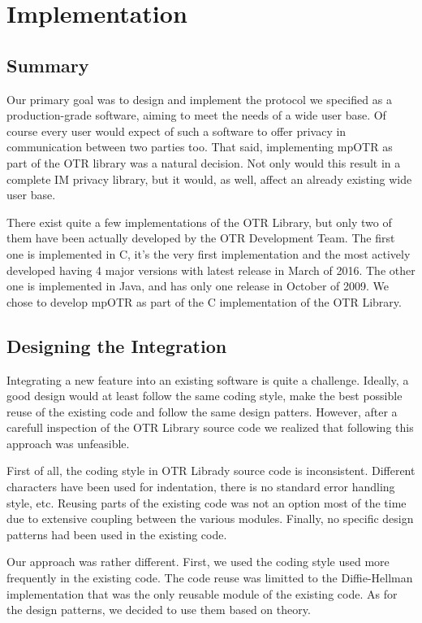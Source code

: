 \chapter{Implementation}
\label{chapters:implementation}


\section{Summary}
Our primary goal was to design and implement the protocol we specified as a production-grade software, aiming to meet the needs of a wide user base. Of course every user would expect of such a software to offer privacy in communication between two parties too. That said, implementing mpOTR as part of the OTR library was a natural decision. Not only would this result in a complete IM privacy library, but it would, as well, affect an already existing wide user base.

There exist quite a few implementations of the OTR Library, but only two of them have been actually developed by the OTR Development Team. The first one is implemented in C, it's the very first implementation and the most actively developed having 4 major versions with latest release in March of 2016. The other one is implemented in Java, and has only one release in October of 2009. We chose to develop mpOTR as part of the C implementation of the OTR Library.

\section{Designing the Integration}
Integrating a new feature into an existing software is quite a challenge. Ideally, a good design would at least follow the same coding style, make the best possible reuse of the existing code and follow the same design patters. However, after a carefull inspection of the OTR Library source code we realized that following this approach was unfeasible.

First of all, the coding style in OTR Librady source code is inconsistent. Different characters have been used for indentation, there is no standard error handling style, etc. Reusing parts of the existing code was not an option most of the time due to extensive coupling between the various modules. Finally, no specific design patterns had been used in the existing code.

Our approach was rather different. First, we used the coding style used more frequently in the existing code. The code reuse was limitted to the Diffie-Hellman implementation that was the only reusable module of the existing code. As for the design patterns, we decided to use them based on theory.


